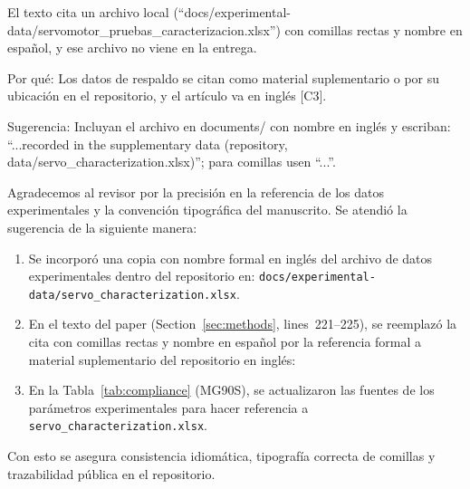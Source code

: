 \documentclass{LabDSTresponse}
\begin{document}
{El texto cita un archivo local (“docs/experimental-data/servomotor\_pruebas\_caracterizacion.xlsx”) con comillas rectas y nombre en español, y ese archivo no viene en la entrega.

Por qué: Los datos de respaldo se citan como material suplementario o por su ubicación en el repositorio, y el artículo va en inglés [C3].

Sugerencia: Incluyan el archivo en documents/ con nombre en inglés y escriban: “...recorded in the supplementary data (repository, data/servo\_characterization.xlsx)”; para comillas usen “...”.}
{Agradecemos al revisor por la precisión en la referencia de los datos experimentales y la convención tipográfica del manuscrito. Se atendió la sugerencia de la siguiente manera:
\begin{enumerate}
    \item Se incorporó una copia con nombre formal en inglés del archivo de datos experimentales dentro del repositorio en:
    \texttt{docs/experimental-data/servo\_characterization.xlsx}.
    \item En el texto del paper (Section~\ref{sec:methods}, lines~221--225), se reemplazó la cita con comillas rectas y nombre en español por la referencia formal a material suplementario del repositorio en inglés:
    \item En la Tabla~\ref{tab:compliance} (MG90S), se actualizaron las fuentes de los parámetros experimentales para hacer referencia a \texttt{servo\_characterization.xlsx}.
\end{enumerate}
Con esto se asegura consistencia idiomática, tipografía correcta de comillas y trazabilidad pública en el repositorio.}

\end{document}
